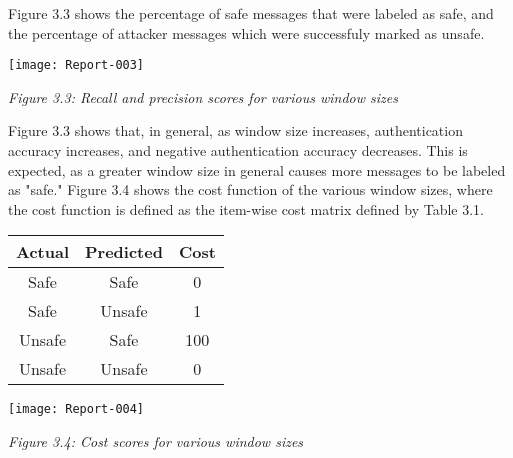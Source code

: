 \documentclass[12pt]{article}
\begin{document}
Figure 3.3 shows the percentage of safe messages that were labeled as safe, and the percentage of attacker messages which were successfuly marked as unsafe.

\begin{center}
\texttt{[image: Report-003]}

\textit{Figure 3.3: Recall and precision scores for various window sizes}
\end{center}

Figure 3.3 shows that, in general, as window size increases, authentication accuracy increases, and negative authentication accuracy decreases. This is expected, as a greater window size in general causes more messages to be labeled as "safe." Figure 3.4 shows the cost function of the various window sizes, where the cost function is defined as the item-wise cost matrix defined by Table 3.1.

\begin{center}
\begin{tabular}{|c|c|c|}
\hline
Actual & Predicted & Cost \\ \hline
Safe & Safe & 0 \\
Safe & Unsafe & 1 \\
Unsafe & Safe & 100 \\
Unsafe & Unsafe & 0 \\
\hline
\end{tabular}

\texttt{[image: Report-004]}

\textit{Figure 3.4: Cost scores for various window sizes}

\end{center}
\end{document}
